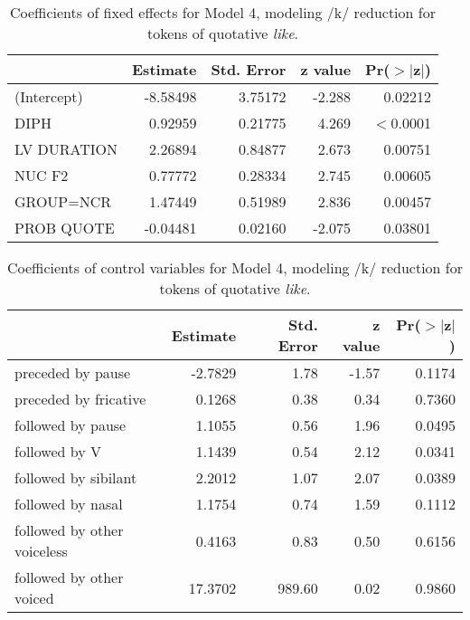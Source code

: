    \begin{table}[ht]
\begin{center}
\begin{tabular}{lrrrr}
  \hline
 & Estimate & Std. Error & z value & Pr($>$$|$z$|$)  \\
  \hline
  
(Intercept)    &  -8.58498  &  3.75172  & -2.288  & 0.02212 \\
DIPH           &  0.92959  &  0.21775  & 4.269 & $<$0.0001 \\  
LV DURATION &  2.26894  &  0.84877  & 2.673  & 0.00751 \\
NUC F2   & 0.77772   & 0.28334  &  2.745 & 0.00605 \\
GROUP=NCR           &  1.47449  &  0.51989  & 2.836 & 0.00457  \\
PROB QUOTE          &  -0.04481  &  0.02160 & -2.075  & 0.03801  \\

   \hline
\end{tabular}
\caption{Coefficients of fixed effects for Model 4, modeling /k/ reduction for tokens of quotative \textit{like}.}
\label{model4coeff}
\end{center}
\end{table}

   
         


\begin{table}[ht]
\begin{center}
\begin{tabular}{lrrrr}
  \hline
 & Estimate & Std. Error & z value & Pr($>$$|$z$|$)  \\
  \hline
preceded by pause    &  -2.7829 &   1.78  & -1.57  & 0.1174 \\
preceded by fricative 	& 0.1268  &  0.38 &  0.34 & 0.7360 \\
followed by pause  &  1.1055  &  0.56  & 1.96 & 0.0495 \\
followed by V   &   1.1439 &   0.54 &  2.12 & 0.0341 \\
followed by sibilant & 2.2012  &  1.07 &  2.07 & 0.0389 \\
followed by nasal &  1.1754  &  0.74  & 1.59 & 0.1112 \\
followed by other voiceless & 0.4163 &   0.83 &  0.50 & 0.6156 \\
followed by other voiced  &  17.3702 & 989.60 &  0.02 & 0.9860 \\ 
   \hline
\end{tabular}
\caption{Coefficients of control variables for Model 4, modeling /k/ reduction for tokens of quotative \textit{like}.}
\label{model4coeff-control}
\end{center}
\end{table}

